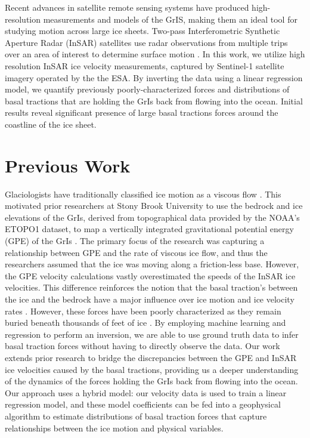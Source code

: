 \documentclass{article}
\begin{document}
Recent advances in satellite remote sensing systems have produced high-resolution measurements and models of the GrIS, making them an ideal tool for studying motion across large ice sheets. Two-pass Interferometric Synthetic Aperture Radar (InSAR) satellites use radar observations from multiple trips over an area of interest to determine surface motion \cite{wild_differential_2019}. In this work, we utilize high resolution InSAR ice velocity measurements, captured by Sentinel-1 satellite imagery operated by the the ESA. By inverting the data using a linear regression model, we quantify previously poorly-characterized forces and distributions of basal tractions that are holding the GrIs back from flowing into the ocean. Initial results reveal significant presence of large basal tractions forces around the coastline of the ice sheet.

\section{Previous Work}

Glaciologists have traditionally classified ice motion as a viscous flow \cite{morland_steady_1980}. This motivated prior researchers at Stony Brook University to use the bedrock and ice elevations of the GrIs, derived from topographical data provided by the NOAA's ETOPO1 dataset, to map a vertically integrated gravitational potential energy (GPE) of the GrIs \cite{information_ncei_etopo1_nodate}. The primary focus of the research was capturing a relationship between GPE and the rate of viscous ice flow, and thus the researchers assumed that the ice was moving along a friction-less base. However, the GPE velocity calculations vastly overestimated the speeds of the InSAR ice velocities. This difference reinforces the notion that the basal traction's between the ice and the bedrock have a major influence over ice motion and ice velocity rates \cite{maier_basal_2021}. However, these forces have been poorly characterized as they remain buried beneath thousands of feet of ice \cite{maier_basal_2021}. By employing machine learning and regression to perform an inversion, we are able to use ground truth data to infer basal traction forces without having to directly observe the data. Our work extends prior research to bridge the discrepancies between the GPE and InSAR ice velocities caused by the basal tractions, providing us a deeper understanding of the dynamics of the forces holding the GrIs back from flowing into the ocean. Our approach uses a hybrid model: our velocity data is used to train a linear regression model, and these model coefficients can be fed into a geophysical algorithm to estimate distributions of basal traction forces that capture relationships between the ice motion and physical variables.
\end{document}
